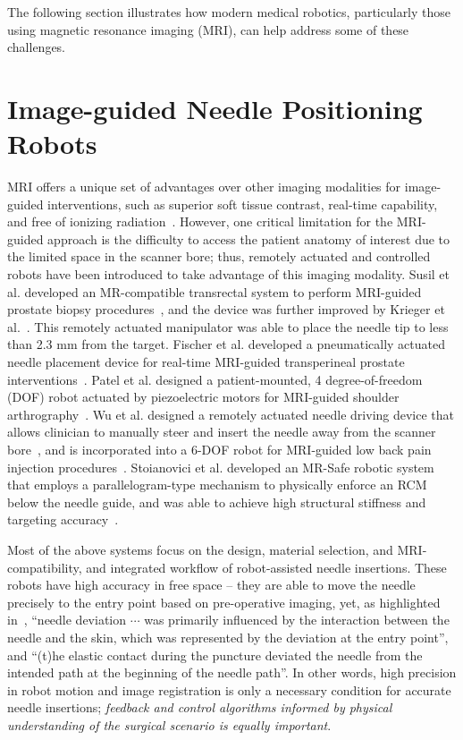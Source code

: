 The following section illustrates how modern medical robotics, particularly those using magnetic resonance imaging (MRI), can help address some of these challenges.

\section{Image-guided Needle Positioning Robots}
\label{sec:image-guided-needle-positioning-robots}

MRI offers a unique set of advantages over other imaging modalities for image-guided interventions, such as superior soft tissue contrast, real-time capability, and free of ionizing radiation~\parencite{tsekosMagneticResonanceCompatible2007}. However, one critical limitation for the MRI-guided approach is the difficulty to access the patient anatomy of interest due to the limited space in the scanner bore; thus, remotely actuated and controlled robots have been introduced to take advantage of this imaging modality. Susil et al. developed an MR-compatible transrectal system to perform MRI-guided prostate biopsy procedures~\parencite{susilSystemMRImage2003, susilSystemProstateBrachytherapy2004}, and the device was further improved by Krieger et al.~\parencite{kriegerDesignNovelMRI2005}. This remotely actuated manipulator was able to place the needle tip to less than 2.3 mm from the target. Fischer et al. developed a pneumatically actuated needle placement device for real-time MRI-guided  transperineal prostate interventions~\parencite{fischerMRICompatiblePneumaticRobot2008}. Patel et al. designed a patient-mounted, 4 degree-of-freedom (DOF) robot actuated by piezoelectric motors for MRI-guided shoulder arthrography~\parencite{patelRoboticSystemMRIGuided2018}. Wu et al. designed a remotely actuated needle driving device that allows clinician to manually steer and insert the needle away from the scanner bore~\parencite{wuRemotelyActuatedNeedle2019}, and is incorporated into a 6-DOF robot for MRI-guided low back pain injection procedures~\parencite{liFullyActuatedBodyMounted2020a}. Stoianovici et al. developed an MR-Safe robotic system that employs a parallelogram-type mechanism to physically enforce an RCM below the needle guide, and was able to achieve high structural stiffness and targeting accuracy~\parencite{stoianoviciMultiImagerCompatibleMR2018}. 

Most of the above systems focus on the design, material selection, and MRI-compatibility, and integrated workflow of robot-assisted needle insertions. These robots have high accuracy in free space -- they are able to move the needle precisely to the entry point based on pre-operative imaging, yet, as highlighted in~\parencite{moreiraEvaluationRobotAssistedMRIGuided2018}, ``needle deviation $\cdots$ was primarily influenced by the interaction between the needle and the skin, which was represented by the deviation at the entry point'', and ``(t)he elastic contact during the puncture deviated the needle from the intended path at the beginning of the needle path''. In other words, high precision in robot motion and image registration is only a necessary condition for accurate needle insertions; \emph{feedback and control algorithms informed by physical understanding of the surgical scenario is equally important}.


